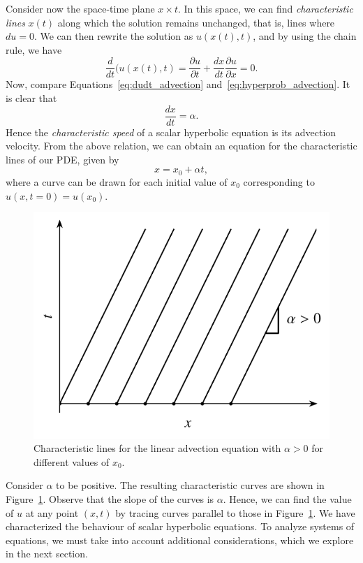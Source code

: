 Consider now the space-time plane $x\times t$. In this space, we can find \textit{characteristic lines} $x(t)$ along which the solution remains unchanged, that is, lines where $du=0$. We can then rewrite the solution as $u(x(t),t)$, and by using the chain rule, we have 
\begin{equation}
	\frac{d}{dt} (u(x(t),t) = \frac{\partial u}{\partial t} + \frac{d x}{dt} \frac{\partial u}{\partial x} = 0.
	\label{eq:dudt_advection}
\end{equation}
Now, compare Equations~\ref{eq:dudt_advection} and~\ref{eq:hyperprob_advection}. It is clear that
\begin{equation}
	\frac{dx}{dt} = \alpha.
	\label{eq:dxdt_advection}
\end{equation}
Hence the \textit{characteristic speed} of a scalar hyperbolic equation is its advection velocity. From the above relation, we can obtain an equation for the characteristic lines of our PDE, given by
\begin{equation}
	x = x_0 + \alpha t,
\end{equation}
where a curve can be drawn for each initial value of $x_0$ corresponding to $u(x,t=0)=u(x_0)$. 
\begin{figure}[htbp]
	\centering
	\includegraphics[width=0.5\linewidth]{Pictures/ch11_lsc_characteristics}
	\caption{Characteristic lines for the linear advection equation with $\alpha>0$ for different values of $x_0$.}
	\label{fig:linscal_charact}
\end{figure}

Consider $\alpha$ to be positive. The resulting characteristic curves are shown in Figure~\ref{fig:linscal_charact}. Observe that the slope of the curves is $\alpha$. Hence, we can find the value of $u$ at any point $(x,t)$ by tracing curves parallel to those in Figure~\ref{fig:linscal_charact}. We have characterized the behaviour of scalar hyperbolic equations. To analyze systems of equations, we must take into account additional considerations, which we explore in the next section.

